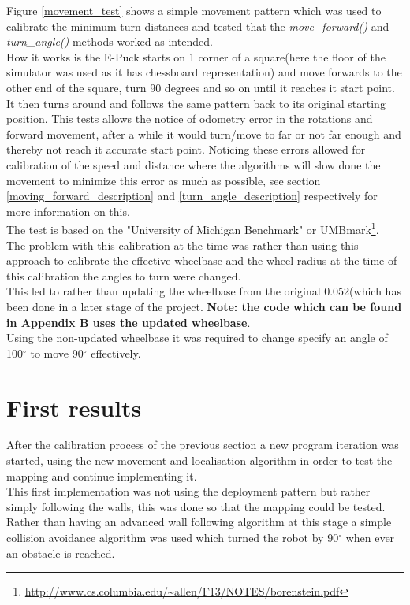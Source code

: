Figure \ref{movement_test} shows a simple movement pattern which was used to calibrate the minimum turn distances and tested that the \textit{move\_forward()} and \textit{turn\_angle()} methods worked as intended. \\
How it works is the E-Puck starts on 1 corner of a square(here the floor of the simulator was used as it has chessboard representation) and move forwards to the other end of the square, turn 90 degrees and so on until it reaches it start point. It then turns around and follows the same pattern back to its original starting position. This tests allows the notice of odometry error in the rotations and forward movement, after a while it would turn/move to far or not far enough and thereby not reach it accurate start point. Noticing these errors allowed for calibration of the speed and distance where the algorithms will slow done the movement to minimize this error as much as possible, see section \ref{moving_forward_description} and \ref{turn_angle_description} respectively for more information on this.\\[3ex]
The test is based on the "University of Michigan Benchmark" or UMBmark\footnote{\url{http://www.cs.columbia.edu/~allen/F13/NOTES/borenstein.pdf}}.\\[3ex]

The problem with this calibration at the time was rather than using this approach to calibrate the effective wheelbase and the wheel radius at the time of this calibration the angles to turn were changed.\\
This led to rather than updating the wheelbase from  the original 0.052(which has been done in a later stage of the project. \textbf{Note: the code which can be found in Appendix B uses the updated wheelbase}.\\
Using the non-updated wheelbase it was required to change specify an angle of 100$^{\circ}$ to move 90$^{\circ}$ effectively.

\section{First results}
After the calibration process of the previous section a new program iteration was started, using the new movement and localisation algorithm in order to test the mapping and continue implementing it. \\[3ex]

This first implementation was not using the deployment pattern but rather simply following the walls, this was done so that the mapping could be tested. Rather than having an advanced wall following algorithm at this stage a simple collision avoidance algorithm was used which turned the robot by 90$^\circ$ when ever an obstacle is reached. 

